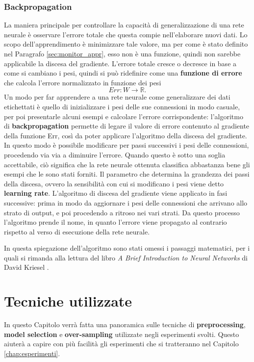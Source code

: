 \documentclass[12pt, twoside, letterpaper]{report}
\begin{document}
			\subsection{Backpropagation} %
				La maniera principale per controllare la capacità di generalizzazione di una rete neurale è osservare l'errore totale che questa compie nell'elaborare nuovi dati. Lo scopo dell'apprendimento è minimizzare tale valore, ma per come è stato definito nel Paragrafo \ref{sec:monitor_appr}, esso non è una funzione, quindi non sarebbe applicabile la discesa del gradiente. L'errore totale cresce o decresce in base a come si cambiano i pesi, quindi si può ridefinire come una \textbf{funzione di errore} che calcola l'errore normalizzato in funzione dei pesi 
				$$Err : W \rightarrow \mathbb{R}.$$
				Un modo per far apprendere a una rete neurale come generalizzare dei dati etichettati è quello di inizializzare i pesi delle sue connessioni in modo casuale, per poi presentarle alcuni esempi e calcolare l'errore corrispondente: l'algoritmo di \textbf{backpropagation} permette di legare il valore di errore contenuto al gradiente della funzione Err, così da poter applicare l'algoritmo della discesa del gradiente. In questo modo è possibile modificare per passi successivi i pesi delle connessioni, procedendo via via a diminuire l'errore. Quando questo è sotto una soglia accettabile, ciò significa che la rete neurale ottenuta classifica abbastanza bene gli esempi che le sono stati forniti. Il parametro che determina la grandezza dei passi della discesa, ovvero la sensibilità con cui si modificano i pesi viene detto \textbf{learning rate}. L'algoritmo di discesa del gradiente viene applicato in fasi successive: prima in modo da aggiornare i pesi delle connessioni che arrivano allo strato di output, e poi procedendo a ritroso nei vari strati. Da questo processo l'algoritmo prende il nome, in quanto l'errore viene propagato al contrario rispetto al verso di esecuzione della rete neurale. 
				
				In questa spiegazione dell'algoritmo sono stati omessi i passaggi matematici, per i quali si rimanda alla lettura del libro \textit{A Brief Introduction to Neural Networks} di David Kriesel \cite{kriesel}.
				
	\chapter{Tecniche utilizzate}
		In questo Capitolo verrà fatta una panoramica sulle tecniche di \textbf{preprocessing}, \textbf{model selection} e \textbf{over-sampling} utilizzate negli esperimenti svolti. Questo aiuterà a capire con più facilità gli esperimenti che si tratteranno nel Capitolo \ref{chap:esperimenti}.
\end{document}
